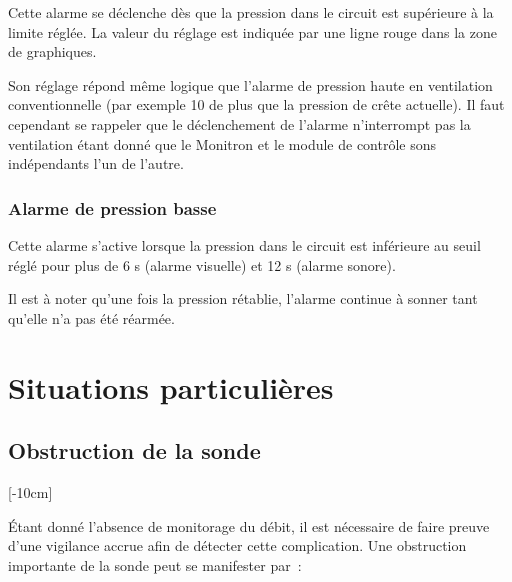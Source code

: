 Cette alarme se déclenche dès que la pression dans le circuit est
supérieure à la limite réglée. La valeur du réglage est indiquée par une
ligne rouge dans la zone de graphiques.

Son réglage répond même logique que l'alarme de pression haute en
ventilation conventionnelle (par exemple 10 \cmh de plus que la
pression de crête actuelle). Il faut cependant se rappeler que le
déclenchement de l'alarme n'interrompt pas la ventilation étant donné
que le Monitron et le module de contrôle sons indépendants l'un de
l'autre.

\subsubsection*{Alarme de pression basse}

Cette alarme s'active lorsque la pression dans le circuit est inférieure
au seuil réglé pour plus de 6 s (alarme visuelle) et 12 s (alarme
sonore).

Il est à noter qu'une fois la pression rétablie, l'alarme continue à
sonner tant qu'elle n'a pas été réarmée.

\section{Situations particulières}

\subsection{Obstruction de la sonde}

[-10cm]

Étant donné l'absence de monitorage du débit, il est nécessaire de faire preuve
d'une vigilance accrue afin de détecter cette complication. Une obstruction
importante de la sonde peut se manifester par :
		
